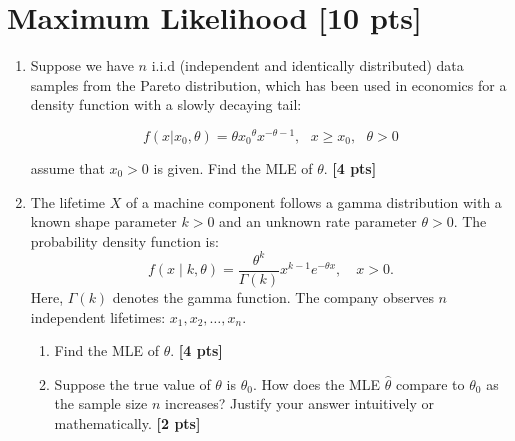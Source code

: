 \documentclass[11pt,epic]{article}
\begin{document}
\section{Maximum Likelihood [10 pts]}
\begin{enumerate}

\item Suppose we have $n$ i.i.d (independent and identically distributed) data samples from the Pareto distribution, which has been used in economics for a density function with a slowly decaying tail:

$$f(x|x_0 , \theta) = \theta {x_0}^\theta x^{-\theta - 1}, \text{   } x\geq x_0, \text{   } \theta > 0 $$

\noindent assume that $x_0 > 0$ is given. Find the MLE of $\theta$. \textbf{[4 pts]}\\

\item The lifetime $X$ of a machine component follows a gamma distribution with a known shape parameter $k > 0$ and an unknown rate parameter $\theta > 0$. The probability density function is:
\[
f(x \mid k, \theta) = \frac{\theta^k}{\Gamma(k)} x^{k-1} e^{-\theta x}, \quad x > 0.
\]
Here, $\Gamma(k)$ denotes the gamma function. The company observes $n$ independent lifetimes: $x_1, x_2, \dots, x_n$.
\begin{enumerate}
    \item Find the MLE of $\theta$. \textbf{[4 pts]}
    \item Suppose the true value of $\theta$ is $\theta_0$. How does the MLE $\hat{\theta}$ compare to $\theta_0$ as the sample size $n$ increases? Justify your answer intuitively or mathematically. \textbf{[2 pts]}
\end{enumerate}

\end{enumerate}
\end{document}
